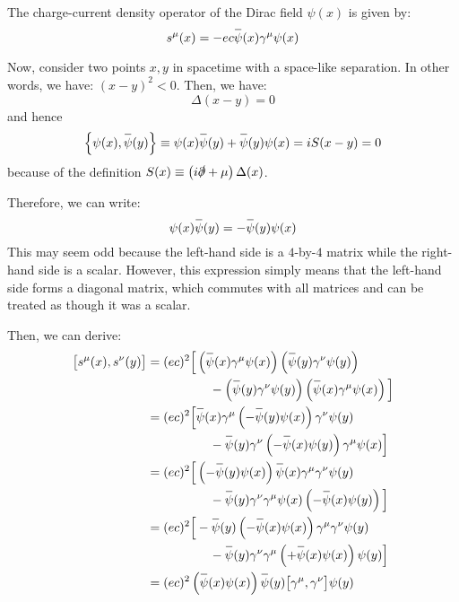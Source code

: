 \documentclass[letterpaper,12pt]{article}
\newenvironment{problem}{\subsection{}\begin{adjustwidth}{0.25in}{}\vspace{-\baselineskip}}{\end{adjustwidth}}
\newcommand{\define}{\equiv}
\newcommand{\overbar}[1]{
	\mkern 1.5mu \overline{\mkern-1.5mu\raisebox{0pt}[\dimexpr\height+0.5mm\relax]{$#1$}\mkern-1.5mu}\mkern 1.5mu
}
\begin{document}
\begin{problem}
The charge-current density operator of the Dirac field $\psi(x)$ is given by:
\begin{equation*}
	s^\mu (x) = -ec \overbar{\psi}(x) \gamma^\mu \psi(x)
\end{equation*}

Now, consider two points $x,y$ in spacetime with a space-like separation. In other words, we have: $(x-y)^2 < 0$. Then, we have:
\begin{equation*}
	\Delta(x-y) = 0
\end{equation*}
and hence
\begin{equation*}
	\left\{\psi(x), \overbar{\psi}(y)\right\} \define \psi(x)\overbar{\psi}(y) + \overbar{\psi}(y)\psi(x) = iS(x-y) = 0
\end{equation*}
because of the definition $S(x) \define \left(i\slashed{\partial} + \mu\right)\Delta(x)$.

Therefore, we can write:
\begin{equation*}
	\psi(x)\overbar{\psi}(y) = -\overbar{\psi}(y)\psi(x)
\end{equation*}
This may seem odd because the left-hand side is a $4$-by-$4$ matrix while the right-hand side is a scalar. However, this expression simply means that the left-hand side forms a diagonal matrix, which commutes with all matrices and can be treated as though it was a scalar.

Then, we can derive:
\begin{align*}
	\big[s^\mu(x), s^\nu(y)\big]
	&= (ec)^2 \Big[ \left(\overbar{\psi}(x)\gamma^\mu\psi(x)\right)\left(\overbar{\psi}(y)\gamma^\nu\psi(y)\right)	\\
	& \hspace{5em} - \left(\overbar{\psi}(y)\gamma^\nu\psi(y)\right) \left(\overbar{\psi}(x)\gamma^\mu\psi(x)\right) \Big]	\\
	&= (ec)^2 \Big[ \overbar{\psi}(x)\gamma^\mu \left(-\overbar{\psi}(y)\psi(x)\right) \gamma^\nu\psi(y)	\\
	& \hspace{5em} - \overbar{\psi}(y)\gamma^\nu \left(-\overbar{\psi}(x)\psi(y)\right) \gamma^\mu\psi(x) \Big]	\\
	&= (ec)^2 \Big[ \left(-\overbar{\psi}(y)\psi(x)\right) \overbar{\psi}(x)\gamma^\mu \gamma^\nu\psi(y)	\\
	& \hspace{5em} - \overbar{\psi}(y)\gamma^\nu \gamma^\mu\psi(x)\left(-\overbar{\psi}(x)\psi(y)\right)\Big]	\\
	&= (ec)^2 \Big[-\overbar{\psi}(y)\left(-\overbar{\psi}(x)\psi(x)\right)\gamma^\mu\gamma^\nu\psi(y)	\\
	& \hspace{5em} - \overbar{\psi}(y)\gamma^\nu\gamma^\mu\left(+\overbar{\psi}(x)\psi(x)\right)\psi(y)	\Big]	\\
	&= (ec)^2 \left(\overbar{\psi}(x)\psi(x)\right) \overbar{\psi}(y)\big[\gamma^\mu, \gamma^\nu\big]\psi(y)
\end{align*}
\end{problem}
\end{document}
